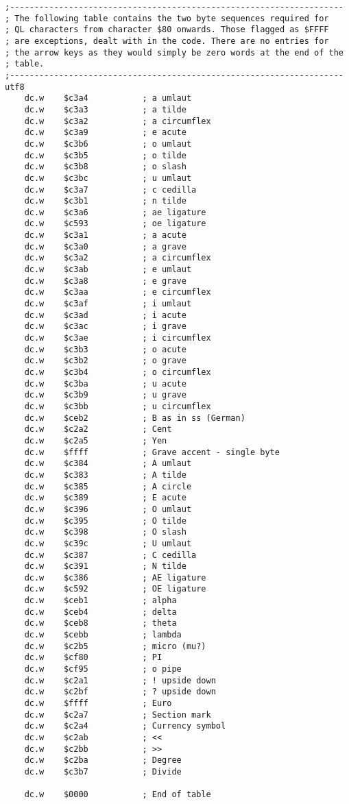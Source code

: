 \begin{lstlisting}[firstnumber=last,caption={Utf82Ql: The UTF8 ``two byte'' character table}]
;--------------------------------------------------------------------
; The following table contains the two byte sequences required for 
; QL characters from character $80 onwards. Those flagged as $FFFF 
; are exceptions, dealt with in the code. There are no entries for
; the arrow keys as they would simply be zero words at the end of the
; table.
;--------------------------------------------------------------------
utf8
    dc.w    $c3a4           ; a umlaut
    dc.w    $c3a3           ; a tilde
    dc.w    $c3a2           ; a circumflex
    dc.w    $c3a9           ; e acute
    dc.w    $c3b6           ; o umlaut
    dc.w    $c3b5           ; o tilde
    dc.w    $c3b8           ; o slash
    dc.w    $c3bc           ; u umlaut
    dc.w    $c3a7           ; c cedilla
    dc.w    $c3b1           ; n tilde
    dc.w    $c3a6           ; ae ligature
    dc.w    $c593           ; oe ligature
    dc.w    $c3a1           ; a acute
    dc.w    $c3a0           ; a grave
    dc.w    $c3a2           ; a circumflex
    dc.w    $c3ab           ; e umlaut
    dc.w    $c3a8           ; e grave
    dc.w    $c3aa           ; e circumflex
    dc.w    $c3af           ; i umlaut
    dc.w    $c3ad           ; i acute
    dc.w    $c3ac           ; i grave
    dc.w    $c3ae           ; i circumflex
    dc.w    $c3b3           ; o acute
    dc.w    $c3b2           ; o grave
    dc.w    $c3b4           ; o circumflex
    dc.w    $c3ba           ; u acute
    dc.w    $c3b9           ; u grave
    dc.w    $c3bb           ; u circumflex
    dc.w    $ceb2           ; B as in ss (German)
    dc.w    $c2a2           ; Cent
    dc.w    $c2a5           ; Yen
    dc.w    $ffff           ; Grave accent - single byte
    dc.w    $c384           ; A umlaut
    dc.w    $c383           ; A tilde
    dc.w    $c385           ; A circle
    dc.w    $c389           ; E acute
    dc.w    $c396           ; O umlaut
    dc.w    $c395           ; O tilde
    dc.w    $c398           ; O slash
    dc.w    $c39c           ; U umlaut
    dc.w    $c387           ; C cedilla
    dc.w    $c391           ; N tilde
    dc.w    $c386           ; AE ligature
    dc.w    $c592           ; OE ligature
    dc.w    $ceb1           ; alpha
    dc.w    $ceb4           ; delta
    dc.w    $ceb8           ; theta
    dc.w    $cebb           ; lambda
    dc.w    $c2b5           ; micro (mu?)
    dc.w    $cf80           ; PI
    dc.w    $cf95           ; o pipe
    dc.w    $c2a1           ; ! upside down
    dc.w    $c2bf           ; ? upside down
    dc.w    $ffff           ; Euro
    dc.w    $c2a7           ; Section mark
    dc.w    $c2a4           ; Currency symbol
    dc.w    $c2ab           ; <<
    dc.w    $c2bb           ; >>
    dc.w    $c2ba           ; Degree
    dc.w    $c3b7           ; Divide

    dc.w    $0000           ; End of table
\end{lstlisting}

